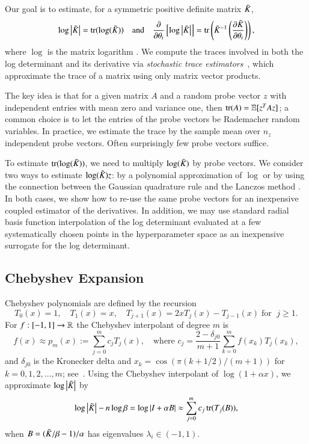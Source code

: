 Our goal is to estimate, for a symmetric positive definite matrix $\tilde{K}_{}$,
\begin{equation}\label{eqn:ldnd}
  \log\left\lvert\tilde{K}_{}\right\rvert = \operatorname{tr}(\log(\tilde{K}_{})) \quad \mbox{and} \quad \frac{\partial}
  {\partial \theta_i} \left[\log\left\lvert\tilde{K}_{}\right\rvert\right] = \operatorname{tr}\left( \tilde{K}_{}^{-1}
  \left(\frac{\partial \tilde{K}_{}}{\partial \theta_i} \right) \right),
\end{equation}
where $\log$ is the matrix logarithm \cite{higham2008functions}. We compute the
traces involved in both the log determinant and its derivative via {\em
stochastic trace estimators}~\cite{hutchinson1990stochastic}, which approximate
the trace of a matrix using only matrix vector products.

The key idea is that for a given matrix $A$ and a random probe vector $z$ with
independent entries with mean zero and variance one, then $\operatorname{tr}(A) = \operatorname{\mathbb{E}}
[z^TAz]$; a common choice is to let the entries of the probe vectors be
Rademacher random variables. In practice, we estimate the trace by the sample
mean over $n_z$ independent probe vectors.  Often surprisingly few probe vectors
suffice.

To estimate $\operatorname{tr}(\log(\tilde{K}_{}))$, we need to multiply $\log(\tilde{K}_{})$ by probe
vectors. We consider two ways to estimate $\log(\tilde{K}_{})z$: by a polynomial
approximation of $\log$ or by using the connection between the Gaussian
quadrature rule and the Lanczos method \cite{han2015large,ubarufast}. In both
cases, we show how to re-use the same probe vectors for an inexpensive coupled
estimator of the derivatives. In addition, we may use standard radial basis
function interpolation of the log determinant evaluated at a few systematically
chosen points in the hyperparameter space as an inexpensive surrogate for the
log determinant.

\subsection{Chebyshev Expansion}\label{sgpsec:che}

Chebyshev polynomials are defined by the recursion
\begin{equation}\label{eqn:chebrecursion}
  T_0(x) = 1, \quad T_1(x) = x, \quad T_{j+1}(x) = 2xT_j(x)-T_{j-1}(x)\; \text{
  for }\; j\geq 1.
\end{equation}
For $f : [-1,1] \to \mathbb{R}$ the Chebyshev interpolant of degree $m$ is
\begin{equation}\label{eqn:chebinterp}
  f(x) \approx p_m(x) := \sum_{j=0}^m c_j T_j(x), \quad \mbox{where } c_j = 
  \frac{2 - \delta_{j0}}{m+1} \displaystyle\sum_{k=0}^m f(x_k)T_j(x_k),
\end{equation}
and $\delta_{j0}$ is the Kronecker delta and $x_k = \cos(\pi(k+1/2)/(m+1))$
for $k=0,1,2,\ldots,m$; see~\cite{gil2007numerical}. Using the Chebyshev
interpolant of $\log(1+\alpha x)$, we approximate $\log\left\lvert\tilde{K}_{}\right\rvert$ by
\begin{equation}\label{eqn:sdescale}
  \log\left\lvert\tilde{K}_{}\right\rvert -n\log\beta = \log\left\lvert I+\alpha B\right\rvert \approx \sum_{j=0}^m
  c_j\operatorname{tr}(T_j(B)),
\end{equation}
when $B=(\tilde{K}_{}/\beta-1)/\alpha$ has eigenvalues $\lambda_i \in (-1,1)$.

